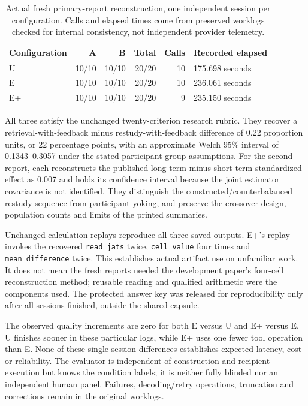 \begin{table}[htbp]\centering\small
\begin{tabularx}{\textwidth}{lrrrrY}
\toprule Configuration & A & B & Total & Calls & Recorded elapsed\\\midrule
U &10/10 &10/10 &20/20 &10 &175.698 seconds\\
E &10/10 &10/10 &20/20 &10 &236.061 seconds\\
E+ &10/10 &10/10 &20/20 &9 &235.150 seconds\\\bottomrule
\end{tabularx}
\caption{Actual fresh primary-report reconstruction, one independent session per configuration. Calls and elapsed times come from preserved worklogs checked for internal consistency, not independent provider telemetry.}
\end{table}

All three satisfy the unchanged twenty-criterion research rubric. They recover a retrieval-with-feedback minus restudy-with-feedback difference of 0.22 proportion units, or 22 percentage points, with an approximate Welch 95\% interval of 0.1343--0.3057 under the stated participant-group assumptions. For the second report, each reconstructs the published long-term minus short-term standardized effect as 0.007 and holds its confidence interval because the joint estimator covariance is not identified. They distinguish the constructed/counterbalanced restudy sequence from participant yoking, and preserve the crossover design, population counts and limits of the printed summaries.

Unchanged calculation replays reproduce all three saved outputs. E+'s replay invokes the recovered \texttt{read\_jats} twice, \texttt{cell\_value} four times and \texttt{mean\_difference} twice. This establishes actual artifact use on unfamiliar work. It does not mean the fresh reports needed the development paper's four-cell reconstruction method; reusable reading and qualified arithmetic were the components used. The protected answer key was released for reproducibility only after all sessions finished, outside the shared capsule.

The observed quality increments are zero for both E versus U and E+ versus E. U finishes sooner in these particular logs, while E+ uses one fewer tool operation than E. None of these single-session differences establishes expected latency, cost or reliability. The evaluator is independent of construction and recipient execution but knows the condition labels; it is neither fully blinded nor an independent human panel. Failures, decoding/retry operations, truncation and corrections remain in the original worklogs.
